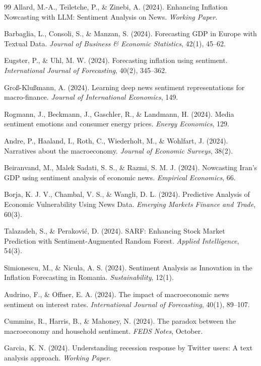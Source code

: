 \documentclass[11pt]{article}
\begin{document}
\begin{thebibliography}{99}
 Allard, M.-A., Teiletche, P., \& Zinebi, A. (2024). Enhancing Inflation Nowcasting with LLM: Sentiment Analysis on News. \textit{Working Paper}.

 Barbaglia, L., Consoli, S., \& Manzan, S. (2024). Forecasting GDP in Europe with Textual Data. \textit{Journal of Business \& Economic Statistics}, 42(1), 45--62.

 Eugster, P., \& Uhl, M. W. (2024). Forecasting inflation using sentiment. \textit{International Journal of Forecasting}, 40(2), 345--362.

 Groß-Klußmann, A. (2024). Learning deep news sentiment representations for macro-finance. \textit{Journal of International Economics}, 149.

 Rogmann, J., Beckmann, J., Gaschler, R., \& Landmann, H. (2024). Media sentiment emotions and consumer energy prices. \textit{Energy Economics}, 129.

 Andre, P., Haaland, I., Roth, C., Wiederholt, M., \& Wohlfart, J. (2024). Narratives about the macroeconomy. \textit{Journal of Economic Surveys}, 38(2).

 Beiranvand, M., Malek Sadati, S. S., \& Razmi, S. M. J. (2024). Nowcasting Iran's GDP using sentiment analysis of economic news. \textit{Empirical Economics}, 66.

 Borja, K. J. V., Chambal, V. S., \& Wangli, D. L. (2024). Predictive Analysis of Economic Vulnerability Using News Data. \textit{Emerging Markets Finance and Trade}, 60(3).

 Talazadeh, S., \& Peraković, D. (2024). SARF: Enhancing Stock Market Prediction with Sentiment-Augmented Random Forest. \textit{Applied Intelligence}, 54(3).

 Simionescu, M., \& Nicula, A. S. (2024). Sentiment Analysis as Innovation in the Inflation Forecasting in Romania. \textit{Sustainability}, 12(1).

 Audrino, F., \& Offner, E. A. (2024). The impact of macroeconomic news sentiment on interest rates. \textit{International Journal of Forecasting}, 40(1), 89--107.

 Cummins, R., Harris, B., \& Mahoney, N. (2024). The paradox between the macroeconomy and household sentiment. \textit{FEDS Notes}, October.

 Garcia, K. N. (2024). Understanding recession response by Twitter users: A text analysis approach. \textit{Working Paper}.


\end{thebibliography}
\end{document}
